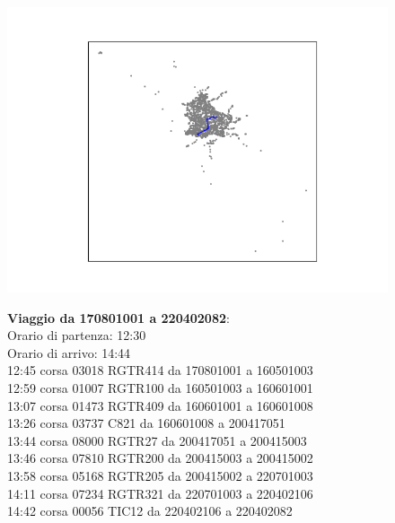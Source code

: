 \documentclass{article}
\begin{document}
\begin{figure}[H]
	\begin{minipage}{0.55\linewidth}
		\centering
		\hspace*{-3cm}\includegraphics[width=1.0\linewidth, valign=t]{figures/170801001_220402082}
	\end{minipage}
	\hspace*{-2cm}\begin{minipage}{0.7\linewidth}
		\textbf{Viaggio da 170801001 a 220402082}:\\
		Orario di partenza: 12:30\\
		Orario di arrivo: 14:44\\
		12:45 corsa 03018 RGTR414 da 170801001 a 160501003\\
		12:59 corsa 01007 RGTR100 da 160501003 a 160601001\\
		13:07 corsa 01473 RGTR409 da 160601001 a 160601008\\
		13:26 corsa 03737 C821 da 160601008 a 200417051\\
		13:44 corsa 08000 RGTR27 da 200417051 a 200415003\\
		13:46 corsa 07810 RGTR200 da 200415003 a 200415002\\
		13:58 corsa 05168 RGTR205 da 200415002 a 220701003\\
		14:11 corsa 07234 RGTR321 da 220701003 a 220402106\\
		14:42 corsa 00056 TIC12 da 220402106 a 220402082
		
			\end{minipage}
\end{figure}
\end{document}

